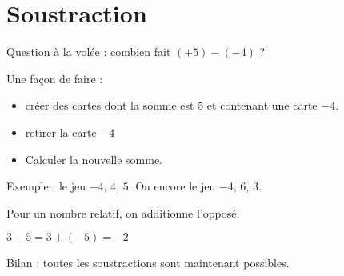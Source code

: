 \section{Soustraction}

Question à la volée : combien fait \( (+5)-(-4)  \) ?

Une façon de faire : 
\begin{itemize}
    \item 
créer des cartes dont la somme est \( 5\) et contenant une carte \( -4\).
\item
    retirer la carte \( -4\)
\item 
    Calculer la nouvelle somme.
\end{itemize}
Exemple : le jeu \( -4\), \( 4\), \( 5\). Ou encore le jeu \( -4\), \( 6\), \( 3\).


\begin{definition}
    Pour  un nombre relatif, on additionne l'opposé.
\end{definition}

\begin{example}
    \( 3-5=3+(-5)=-2\)
\end{example}

Bilan : toutes les soustractions sont maintenant possibles.
